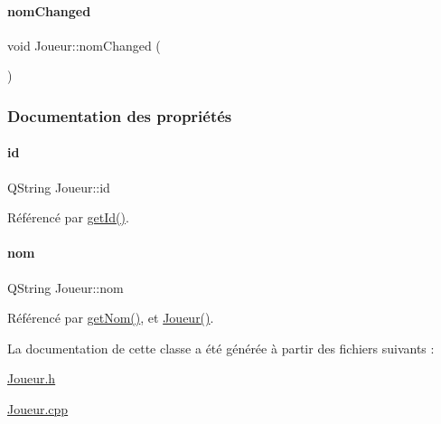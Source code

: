 \mbox{\label{class_joueur_ad1e3e8841ef26f9d6e01217c4722aea6}} 
\paragraph{\texorpdfstring{nom\+Changed}{nomChanged}}
{\footnotesize\ttfamily void Joueur\+::nom\+Changed (\begin{DoxyParamCaption}{ }\end{DoxyParamCaption})\hspace{0.3cm}{\ttfamily [signal]}}



\subsubsection{Documentation des propriétés}
\mbox{\label{class_joueur_a99c42cd3be344a1348064aca8619c82b}} 
\paragraph{\texorpdfstring{id}{id}}
{\footnotesize\ttfamily Q\+String Joueur\+::id\hspace{0.3cm}{\ttfamily [read]}}



Référencé par \hyperlink{class_joueur_a51dd9768967c044036b7d1405370b99d}{get\+Id()}.

\mbox{\label{class_joueur_ab06d7f1e6b482299bb03919e0cd2166d}} 
\paragraph{\texorpdfstring{nom}{nom}}
{\footnotesize\ttfamily Q\+String Joueur\+::nom\hspace{0.3cm}{\ttfamily [read]}}



Référencé par \hyperlink{class_joueur_a0a9e2adb0d6816def1d5894c389dac96}{get\+Nom()}, et \hyperlink{class_joueur_a36774818f07cf7a06681250dca1fdd81}{Joueur()}.



La documentation de cette classe a été générée à partir des fichiers suivants \+:\begin{DoxyCompactItemize}
\item 
\hyperlink{_joueur_8h}{Joueur.\+h}\item 
\hyperlink{_joueur_8cpp}{Joueur.\+cpp}\end{DoxyCompactItemize}
